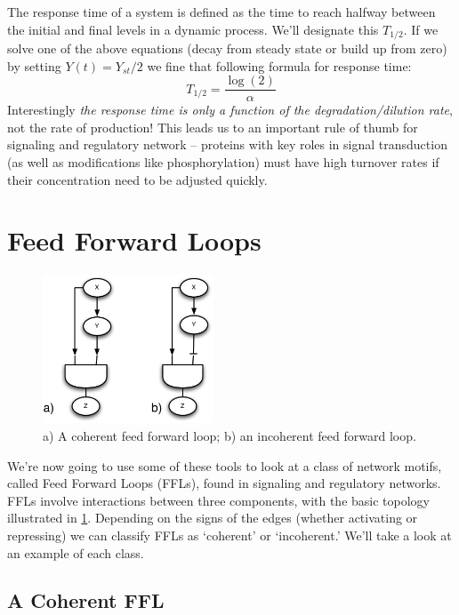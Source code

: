 \documentclass[11pt,letterpaper,oneside,pagesize]{scrartcl}
\begin{document}
The response time of a system is defined as the time to reach halfway between the initial and final levels in a dynamic process. We'll designate this $T_{1/2}$. If we solve one of the above equations (decay from steady state or build up from zero) by setting $Y(t) = Y_{st}/2$ we fine that following formula for response time:
\[
T_{1/2} = \frac{\log(2)}{\alpha}
\]
%
Interestingly \emph{the response time is only a function of the degradation/dilution rate}, not the rate of production!  This leads us to an important rule of thumb for signaling and regulatory network -- proteins with key roles in signal transduction (as well as modifications like phosphorylation) must have high turnover rates if their concentration need to be adjusted quickly.

\section{Feed Forward Loops}

\begin{figure}[lht]
\centering
 \includegraphics[width=2in]{FFLs.pdf}
\caption{a) A coherent feed forward loop; b) an incoherent feed forward loop.}
\label{fig:FFL}
\end{figure}

We're now going to use some of these tools to look at a class of network motifs, called Feed Forward Loops (FFLs), found in signaling and regulatory networks. FFLs involve interactions between three components, with the basic topology illustrated in \cref{fig:FFL}. Depending on the signs of the edges (whether activating or repressing) we can classify FFLs as `coherent' or `incoherent.' We'll take a look at an example of each class.


\subsection{A Coherent FFL}
\end{document}
